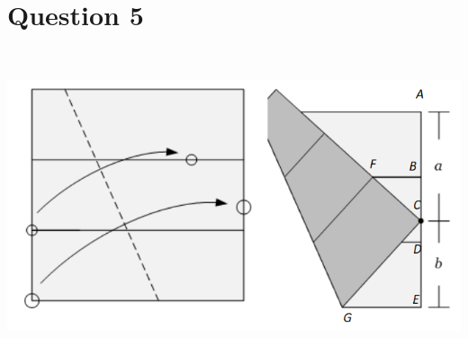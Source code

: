\documentclass{article}
\begin{document}
\newpage

\section*{Question 5}

~

\includegraphics[scale=0.5]{HW_0214/5.png}
\end{document}
